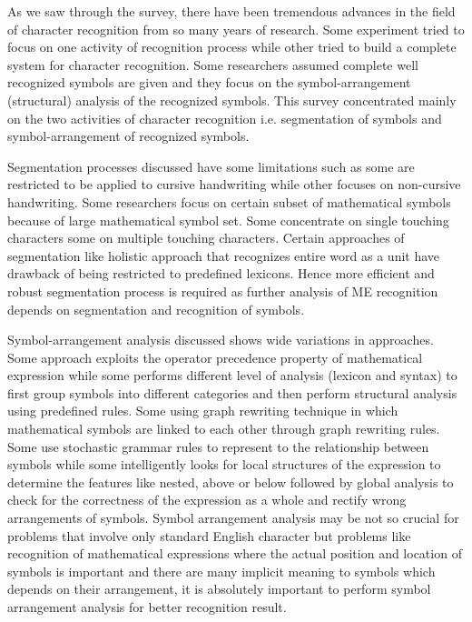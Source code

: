 As we saw through the survey, there have been tremendous advances in
the field of character recognition from so many years of research.
Some experiment tried to focus on one activity of recognition
process while other tried to build a complete system for character
recognition. Some researchers assumed complete well recognized
symbols are given and they focus on the symbol-arrangement
(structural) analysis of the recognized symbols. This survey
concentrated mainly on the two activities of character recognition
i.e. segmentation of symbols and symbol-arrangement of recognized
symbols.

Segmentation processes discussed have some limitations such as some
are restricted to be applied to cursive handwriting while other
focuses on non-cursive handwriting. Some researchers focus on
certain subset of mathematical symbols because of large mathematical
symbol set. Some concentrate on single touching characters some on
multiple touching characters. Certain approaches of segmentation
like holistic approach that recognizes entire word as a unit have
drawback of being restricted to predefined lexicons. Hence more
efficient and robust segmentation process is required as further
analysis of ME recognition depends on segmentation and recognition
of symbols.

Symbol-arrangement analysis discussed shows wide variations in
approaches. Some approach exploits the operator precedence property
of mathematical expression while some performs different level of
analysis (lexicon and syntax) to first group symbols into different
categories and then perform structural analysis using predefined
rules. Some using graph rewriting technique in which mathematical
symbols are linked to each other through graph rewriting rules. Some
use stochastic grammar rules to represent to the relationship
between symbols while some intelligently looks for local structures
of the expression to determine the features like nested, above or
below followed by global analysis to check for the correctness of
the expression as a whole and rectify wrong arrangements of symbols.
Symbol arrangement analysis may be not so crucial for problems that
involve only standard English character but problems like
recognition of mathematical expressions where the actual position
and location of symbols is important and there are many implicit
meaning to symbols which depends on their arrangement, it is
absolutely important to perform symbol arrangement analysis for
better recognition result.
